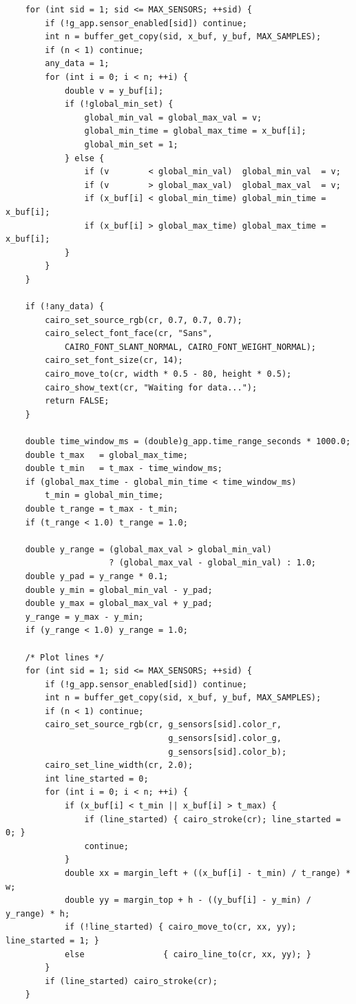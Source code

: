 \begin{verbatim}
    for (int sid = 1; sid <= MAX_SENSORS; ++sid) {
        if (!g_app.sensor_enabled[sid]) continue;
        int n = buffer_get_copy(sid, x_buf, y_buf, MAX_SAMPLES);
        if (n < 1) continue;
        any_data = 1;
        for (int i = 0; i < n; ++i) {
            double v = y_buf[i];
            if (!global_min_set) {
                global_min_val = global_max_val = v;
                global_min_time = global_max_time = x_buf[i];
                global_min_set = 1;
            } else {
                if (v        < global_min_val)  global_min_val  = v;
                if (v        > global_max_val)  global_max_val  = v;
                if (x_buf[i] < global_min_time) global_min_time = x_buf[i];
                if (x_buf[i] > global_max_time) global_max_time = x_buf[i];
            }
        }
    }

    if (!any_data) {
        cairo_set_source_rgb(cr, 0.7, 0.7, 0.7);
        cairo_select_font_face(cr, "Sans",
            CAIRO_FONT_SLANT_NORMAL, CAIRO_FONT_WEIGHT_NORMAL);
        cairo_set_font_size(cr, 14);
        cairo_move_to(cr, width * 0.5 - 80, height * 0.5);
        cairo_show_text(cr, "Waiting for data...");
        return FALSE;
    }

    double time_window_ms = (double)g_app.time_range_seconds * 1000.0;
    double t_max   = global_max_time;
    double t_min   = t_max - time_window_ms;
    if (global_max_time - global_min_time < time_window_ms)
        t_min = global_min_time;
    double t_range = t_max - t_min;
    if (t_range < 1.0) t_range = 1.0;

    double y_range = (global_max_val > global_min_val)
                     ? (global_max_val - global_min_val) : 1.0;
    double y_pad = y_range * 0.1;
    double y_min = global_min_val - y_pad;
    double y_max = global_max_val + y_pad;
    y_range = y_max - y_min;
    if (y_range < 1.0) y_range = 1.0;

    /* Plot lines */
    for (int sid = 1; sid <= MAX_SENSORS; ++sid) {
        if (!g_app.sensor_enabled[sid]) continue;
        int n = buffer_get_copy(sid, x_buf, y_buf, MAX_SAMPLES);
        if (n < 1) continue;
        cairo_set_source_rgb(cr, g_sensors[sid].color_r,
                                 g_sensors[sid].color_g,
                                 g_sensors[sid].color_b);
        cairo_set_line_width(cr, 2.0);
        int line_started = 0;
        for (int i = 0; i < n; ++i) {
            if (x_buf[i] < t_min || x_buf[i] > t_max) {
                if (line_started) { cairo_stroke(cr); line_started = 0; }
                continue;
            }
            double xx = margin_left + ((x_buf[i] - t_min) / t_range) * w;
            double yy = margin_top + h - ((y_buf[i] - y_min) / y_range) * h;
            if (!line_started) { cairo_move_to(cr, xx, yy); line_started = 1; }
            else                { cairo_line_to(cr, xx, yy); }
        }
        if (line_started) cairo_stroke(cr);
    }


\end{verbatim}
